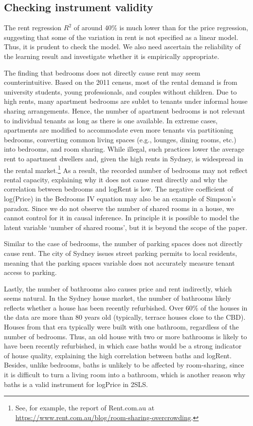 \documentclass[11pt,review,authoryear]{elsarticle}
\begin{document}
\subsection{Checking instrument validity}

\textcolor[rgb]{0.00,0.00,1.00}{The rent regression $R^2$ of around 40\% is much lower than for the price regression, suggesting that some of the variation in rent is not specified as a linear model.} Thus, it is prudent to check the model. We also need ascertain the reliability of the learning result and investigate whether it is empirically appropriate.

The finding that bedrooms does not directly cause rent may seem counterintuitive. Based on the 2011 census, most of the rental demand is from university students, young professionals, and couples without children. Due to high rents, many apartment bedrooms are sublet to tenants under informal house sharing arrangements. Hence, the number of apartment bedrooms is not relevant to individual tenants as long as there is one available. In extreme cases, apartments are modified to accommodate even more tenants via partitioning bedrooms, converting common living spaces (e.g., lounges, dining rooms, etc.) into bedrooms, and room sharing. While illegal, such practices lower the average rent to apartment dwellers and, given the high rents in Sydney, is widespread in the rental market.\footnote{See, for example, the report of Rent.com.au at \url{https://www.rent.com.au/blog/room-sharing-overcrowding}.} As a result, the recorded number of bedrooms may not reflect rental capacity, explaining why it does not cause rent directly and why the correlation between bedrooms and logRent is low. The negative coefficient of log(Price) in the Bedrooms IV equation may also be an example of Simpson's paradox. Since we do not observe the number of shared rooms in a house, we cannot control for it in causal inference. In principle it is possible to model the latent variable `number of shared rooms', but it is beyond the scope of the paper.

Similar to the case of bedrooms, the number of parking spaces does not directly cause rent. The city of Sydney issues street parking permits to local residents, meaning that the parking spaces variable does not accurately measure tenant access to parking.

Lastly, the number of bathrooms also causes price and rent indirectly, which seems natural. In the Sydney house market, the number of bathrooms likely reflects whether a house has been recently refurbished. Over 60\% of the houses in the data are more than 80 years old (typically, terrace houses close to the CBD). Houses from that era typically were built with one bathroom, regardless of the number of bedrooms. Thus, an old house with two or more bathrooms is likely to have been recently refurbished, in which case baths would be a strong indicator of house quality, explaining the high correlation between baths and logRent. Besides, unlike bedrooms, baths is unlikely to be affected by room-sharing, since it is difficult to turn a living room into a bathroom, which is another reason why baths is a valid instrument for logPrice in 2SLS.
\end{document}
